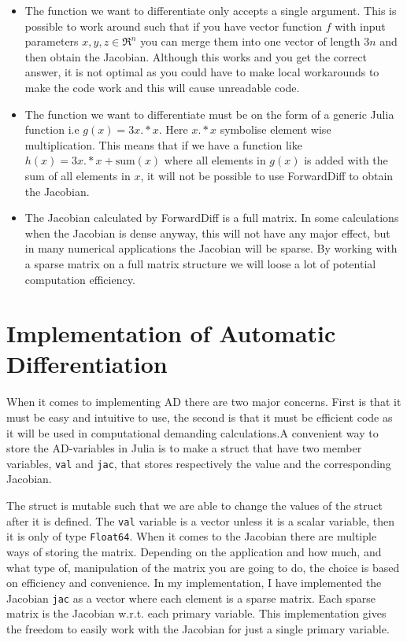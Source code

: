 \begin{itemize}
    \item The function we want to differentiate only accepts a single argument. This is possible to work around such that if you have vector function $f$ with input parameters $x,y,z \in \Re^n$ you can merge them into one vector of length $3n$ and then obtain the Jacobian. Although this works and you get the correct answer, it is not optimal as you could have to make local workarounds to make the code work and this will cause unreadable code.
    \item The function we want to differentiate must be on the form of a generic Julia function i.e $g(x) = 3x.*x$. Here $x.*x$ symbolise element wise multiplication. This means that if we have a function like $h(x) = 3x.*x + \text{sum}(x)$ where all elements in $g(x)$ is added with the sum of all elements in $x$, it will not be possible to use ForwardDiff to obtain the Jacobian.
    \item The Jacobian calculated by ForwardDiff is a full matrix. In some calculations when the Jacobian is dense anyway, this will not have any major effect, but in many numerical applications the Jacobian will be sparse. By working with a sparse matrix on a full matrix structure we will loose a lot of potential computation efficiency.
\end{itemize}

\section{Implementation of Automatic Differentiation}
When it comes to implementing AD there are two major concerns. First is that it must be easy and intuitive to use, the second is that it must be efficient code as it will be used in computational demanding calculations.A convenient way to store the AD-variables in Julia is to make a struct that have two member variables, \texttt{val} and \texttt{jac}, that stores respectively the value and the corresponding Jacobian. 
 
The struct is mutable such that we are able to change the values of the struct after it is defined. The \texttt{val} variable is a vector unless it is a scalar variable, then it is only of type  \texttt{Float64}. When it comes to the Jacobian there are multiple ways of storing the matrix. Depending on the application and how much, and what type of, manipulation of the matrix you are going to do, the choice is based on efficiency and convenience. In my implementation, I have implemented the Jacobian \texttt{jac} as a vector where each element is a sparse matrix. Each sparse matrix is the Jacobian w.r.t. each primary variable. This implementation gives the freedom to easily work with the Jacobian for just a single primary variable.


